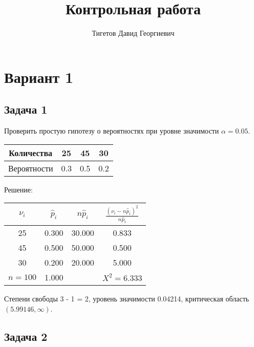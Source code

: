 \documentclass[a4paper,12pt]{article}
\begin{document}
\title{Контрольная работа}
\author{Тигетов Давид Георгиевич}
\maketitle

\section*{Вариант 1}

\subsection*{Задача 1}

Проверить простую гипотезу о вероятностях при уровне значимости $\alpha = 0.05$.

\begin{tabular}{|c|c|c|c|}
    \hline
    Количества  & 25  & 45  & 30  \\
    \hline
    Вероятности & 0.3 & 0.5 & 0.2 \\
    \hline
\end{tabular}

Решение:

\begin{tabular}{|c|c|c|c|}
    \hline
    $\nu_i$   & $\widehat{p}_i$ & $n \widehat{p}_i$ & $\frac{(\nu_i - n \widehat{p}_i)^2}{n \widehat{p}_i}$ \\
    \hline
    25        & 0.300           & 30.000            & 0.833                                                 \\
    45        & 0.500           & 50.000            & 0.500                                                 \\
    30        & 0.200           & 20.000            & 5.000                                                 \\
    \hline
    $n = 100$ & 1.000           &                   & $X^2 = 6.333$                                         \\
    \hline
\end{tabular}

Степени свободы 3 - 1 = 2, уровень значимости 0.04214, критическая область $(5.99146, \infty)$.



\subsection*{Задача 2}
\end{document}
